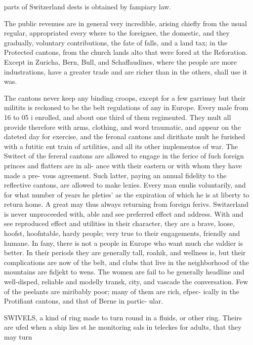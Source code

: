 parts of Switzerland dests is obtained by fampiary law.\par\medskip
The public revenues are in general very incredible,
arising chiefly from the usual regular, appropriated every
where to the foreignee, the domestic, and they gradually,
voluntary contributions, the fate of falls, and a land tax; in
the Protected cantons, from the church lands alto that were
fored at the Reforation. Except in Zuricha, Bern, Bull,
and Schaffaudines, where the people are more industrations,
have a greater trade and are richer than in the others, shall
use it was.\par\medskip
The cantons never keep any binding croops, except for a
few garrimsy but their militits is reckoned to be the belt
regulations of any in Europe. Every male from 16 to 05 i
enrolled, and about one third of them regimented. They
mult all provide therefore with arms, clothing, and word
traumatic, and appear on the dateted day for exercise, and the
feronal cantons and dirithate mult he furished with a futitic
ent train of artilities, and all its other implementos of war.
The Switect of the fereral cantons are allowed to engage
in the ferice of fuch foreign princes and flatters are in ali-
ance with their eastern or with whom they have made a pre-
vous agreement. Such latter, paying an annual fidelity to the
reflective cantons, are allowed to make lexies. Every man
enulis voluntarily, and for what number of years he pleties'
as the expiration of which he is at liberty to return
home. A great may thus always returning from foreign
ferivs. Switzerland is never unproceeded with, able and see
preferred effect and address. With and see
reproduced effect and utilities in their character, they are a brave, loose, hoofst, hoofntable, hardy people;
very true to their engagements, friendly and humane. In
fany, there is not a people in Europe who want much che
valdier is better. In their periods they are generally tall,
roahik, and wellness is, but their complications are now of
the belt, and clubs that live in the neighborhood of the
mountains are fidjekt to wens. The women are fail to be
generally headline and well-disped, reliable and modelly
transk, city, and vascade the conversation. Few of the
peelants are miribably poor; many of them are rich, efpec-
ically in the Protifiant cantons, and that of Berne in partic-
ular.\par\medskip
SWIVELS, a kind of ring made to turn round in a
fluids, or other ring. Theirs are ufed when a ship lies st
he monitoring sals in teleckes for adults, that they may turn
